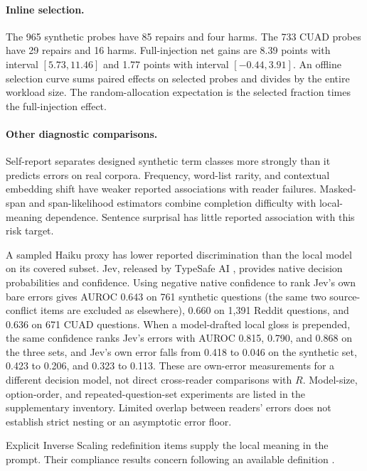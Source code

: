 \paragraph{Inline selection.}
The 965 synthetic probes have 85 repairs and four harms. The 733 CUAD probes have 29 repairs and 16 harms. Full-injection net gains are 8.39 points with interval $[5.73,11.46]$ and 1.77 points with interval $[-0.44,3.91]$. An offline selection curve sums paired effects on selected probes and divides by the entire workload size. The random-allocation expectation is the selected fraction times the full-injection effect.

\paragraph{Other diagnostic comparisons.}
Self-report separates designed synthetic term classes more strongly than it predicts errors on real corpora. Frequency, word-list rarity, and contextual embedding shift have weaker reported associations with reader failures. Masked-span and span-likelihood estimators combine completion difficulty with local-meaning dependence. Sentence surprisal has little reported association with this risk target.

A sampled Haiku proxy has lower reported discrimination than the local model on its covered subset. Jev, released by TypeSafe AI \citep{jev}, provides native decision probabilities and confidence. Using negative native confidence to rank Jev's own bare errors gives AUROC 0.643 on 761 synthetic questions (the same two source-conflict items are excluded as elsewhere), 0.660 on 1,391 Reddit questions, and 0.636 on 671 CUAD questions. When a model-drafted local gloss is prepended, the same confidence ranks Jev's errors with AUROC 0.815, 0.790, and 0.868 on the three sets, and Jev's own error falls from 0.418 to 0.046 on the synthetic set, 0.423 to 0.206, and 0.323 to 0.113. These are own-error measurements for a different decision model, not direct cross-reader comparisons with $R$. Model-size, option-order, and repeated-question-set experiments are listed in the supplementary inventory. Limited overlap between readers' errors does not establish strict nesting or an asymptotic error floor.

Explicit Inverse Scaling redefinition items supply the local meaning in the prompt. Their compliance results concern following an available definition \citep{inverse-scaling,redefine-pitfalls}.

